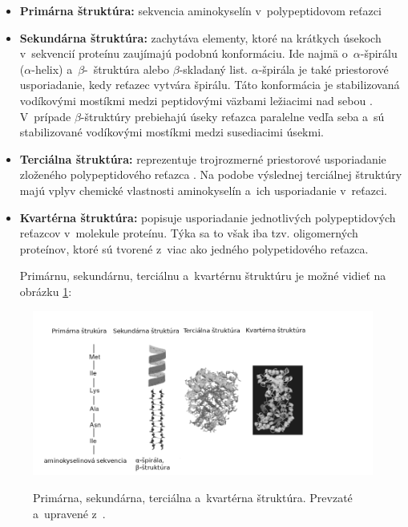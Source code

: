 \begin{itemize}
	\item \textbf{Primárna štruktúra:} sekvencia aminokyselín v~polypeptidovom reťazci
	\item \textbf{Sekundárna štruktúra:} zachytáva elementy, ktoré na krátkych úsekoch v~sekvencií proteínu zaujímajú podobnú konformáciu. Ide najmä o~$\alpha$\--špirálu ($\alpha$\--helix) a~$\beta$\--~štruktúra alebo $\beta$\--skladaný list. $\alpha$\--špirála je také priestorové usporiadanie, kedy reťazec vytvára špirálu. Táto konformácia je stabilizovaná vodíkovými mostíkmi medzi peptidovými väzbami ležiacimi nad sebou \cite{aminokyseliny}. V~prípade $\beta$\--štruktúry prebiehajú úseky reťazca paralelne vedľa seba a~sú stabilizované vodíkovými mostíkmi medzi susediacimi úsekmi.
	\item \textbf{Terciálna štruktúra:} reprezentuje trojrozmerné priestorové usporiadanie zloženého polypeptidového reťazca \cite{aminokyseliny}. Na podobe výslednej terciálnej štruktúry majú vplyv chemické vlastnosti aminokyselín a~ich usporiadanie v~reťazci. 
	\item \textbf{Kvartérna štruktúra:} popisuje usporiadanie jednotlivých polypeptidových reťazcov v~molekule proteínu. Týka sa to však iba tzv. oligomerných proteínov, ktoré sú tvorené z~viac ako jedného polypetidového reťazca.
	
	Primárnu, sekundárnu, terciálnu a~kvartérnu štruktúru je možné vidieť na obrázku \ref{struktura}:
\end{itemize}
\begin{figure}[H]
		\begin{center}
		\scalebox{0.5}
		{   
			\includegraphics{structure.png}
		}
		\caption{Primárna, sekundárna, terciálna a~kvartérna štruktúra. Prevzaté a~upravené z~\cite{gromiha}.}
		\label{struktura}
	\end{center}
\end{figure}

